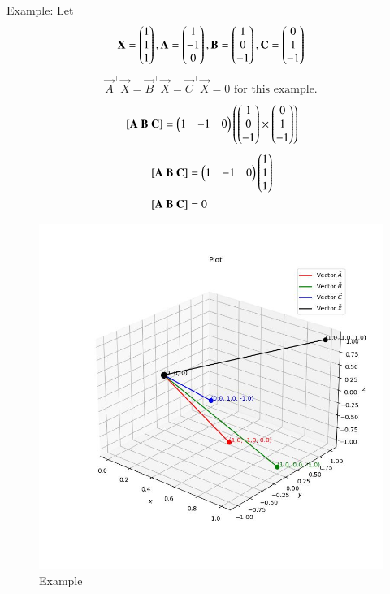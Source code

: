 \documentclass[journal]{IEEEtran}
\begin{document}
Example: Let
\begin{align*}
    \mathbf{X}=\begin{pmatrix}1 \\ 1 \\ 1\end{pmatrix}, \mathbf{A}=\begin{pmatrix}1 \\ -1 \\ 0\end{pmatrix}, \mathbf{B}=\begin{pmatrix}1 \\ 0 \\ -1\end{pmatrix}, \mathbf{C}=\begin{pmatrix}0 \\ 1 \\ -1\end{pmatrix}
\end{align*}
\begin{align}
    \vec{A}^\top \vec{X} = \vec{B}^\top \vec{X} = \vec{C}^\top \vec{X} = 0\text{ for this example.}
\end{align}
\begin{align}
    {}\left[\mathbf{A}\ \mathbf{B}\ \mathbf{C}\right] = \begin{pmatrix}1 & -1 & 0\end{pmatrix}\left(\begin{pmatrix}1 \\ 0 \\ -1\end{pmatrix}\times\begin{pmatrix}0 \\ 1 \\ -1\end{pmatrix}\right)
\end{align}
\begin{align}
    {}\left[\mathbf{A}\ \mathbf{B}\ \mathbf{C}\right] &= \begin{pmatrix}1 & -1 & 0\end{pmatrix} \begin{pmatrix}1 \\ 1 \\ 1\end{pmatrix} \\
    {}\left[\mathbf{A}\ \mathbf{B}\ \mathbf{C}\right] &= 0
\end{align}

\begin{figure}[h!]
    \centering
    \includegraphics[width=0.7\columnwidth]{figs/plot_c.jpg}
    \caption*{Example}
    \label{fig:fig}
\end{figure}
    
\end{document}
